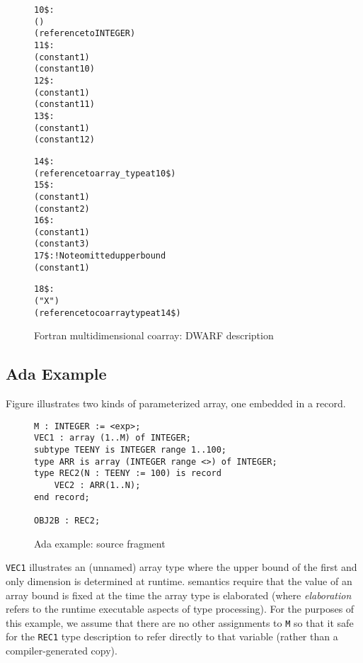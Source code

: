 \begin{figure}[here]
\begin{dwflisting}
\begin{alltt}
10\$: \DWTAGarraytype
        \DWATordering(\DWORDcolmajor)
        \DWATtype(reference to INTEGER)
11\$:    \DWTAGsubrangetype
            \DWATlowerbound(constant 1)
            \DWATupperbound(constant 10)
12\$:    \DWTAGsubrangetype
            \DWATlowerbound(constant  1)
            \DWATupperbound(constant 11)
13\$:    \DWTAGsubrangetype
            \DWATlowerbound(constant  1)
            \DWATupperbound(constant 12)

14\$: \DWTAGcoarraytype
        \DWATtype(reference to array_type at 10\$)
15\$:    \DWTAGsubrangetype
            \DWATlowerbound(constant 1)
            \DWATupperbound(constant 2)
16\$:    \DWTAGsubrangetype
            \DWATlowerbound(constant 1)
            \DWATupperbound(constant 3)
17\$:    \DWTAGsubrangetype                ! Note omitted upper bound
            \DWATlowerbound(constant 1)

18\$: \DWTAGvariable
        \DWATname("X")
        \DWATtype(reference to coarray type at 14\$)
\end{alltt}
\end{dwflisting}
\caption{Fortran multidimensional coarray: DWARF description}
\label{fig:FortranmultidimensionalcoarrayDWARFdescription}
\end{figure}

\clearpage
\subsection{Ada Example}
\label{app:adaexample}
Figure 
illustrates two kinds of  
parameterized array, one embedded in a record.

\begin{figure}[here]
\begin{lstlisting}
M : INTEGER := <exp>;
VEC1 : array (1..M) of INTEGER;
subtype TEENY is INTEGER range 1..100;
type ARR is array (INTEGER range <>) of INTEGER;
type REC2(N : TEENY := 100) is record
    VEC2 : ARR(1..N);
end record;

OBJ2B : REC2;
\end{lstlisting}
\caption{Ada example: source fragment}
\label{fig:adaexamplesourcefragment}
\end{figure}

\texttt{VEC1} illustrates an (unnamed) array type where the upper bound
of the first and only dimension is determined at runtime. 
semantics require that the value of an array bound is fixed at
the time the array type is elaborated (where \textit{elaboration} refers
to the runtime executable aspects of type processing). For
the purposes of this example, we assume that there are no
other assignments to \texttt{M} so that it safe for the \texttt{REC1} type
description to refer directly to that variable (rather than
a compiler-generated copy).

